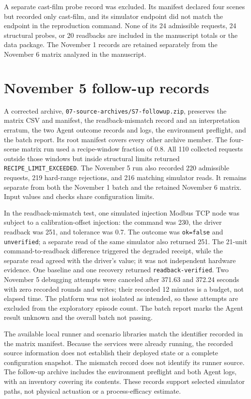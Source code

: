 \documentclass[10pt]{article}
\begin{document}
A separate cast-film probe record was excluded. Its manifest declared four scenes but recorded only cast-film, and its simulator endpoint did not match the endpoint in the reproduction command. None of its 24 admissible requests, 24 structural probes, or 20 readbacks are included in the manuscript totals or the data package. The November 1 records are retained separately from the November 6 matrix analyzed in the manuscript.

\section*{November 5 follow-up records}
A corrected archive, \texttt{07-source-archives/S7-followup.zip}, preserves the matrix CSV and manifest, the readback-mismatch record and an interpretation erratum, the two Agent outcome records and logs, the environment preflight, and the batch report. Its root manifest covers every other archive member. The four-scene matrix run used a recipe-window fraction of 0.8. All 110 collected requests outside those windows but inside structural limits returned \texttt{RECIPE\_LIMIT\_EXCEEDED}. The November 5 run also recorded 220 admissible requests, 219 hard-range rejections, and 216 matching simulator reads. It remains separate from both the November 1 batch and the retained November 6 matrix. Input values and checks share configuration limits.

In the readback-mismatch test, one simulated injection Modbus TCP node was subject to a calibration-offset injection: the command was 230, the driver readback was 251, and tolerance was 0.7. The outcome was \texttt{ok=false} and \texttt{unverified}; a separate read of the same simulator also returned 251. The 21-unit command-to-readback difference triggered the degraded receipt, while the separate read agreed with the driver's value; it was not independent hardware evidence. One baseline and one recovery returned \texttt{readback-verified}. Two November 5 debugging attempts were canceled after 371.63 and 372.24 seconds with zero recorded rounds and writes; their recorded 12 minutes is a budget, not elapsed time. The platform was not isolated as intended, so these attempts are excluded from the exploratory episode count. The batch report marks the Agent result unknown and the overall batch not passing.

The available local runner and scenario libraries match the identifier recorded in the matrix manifest. Because the services were already running, the recorded source information does not establish their deployed state or a complete configuration snapshot. The mismatch record does not identify its runner source. The follow-up archive includes the environment preflight and both Agent logs, with an inventory covering its contents. These records support selected simulator paths, not physical actuation or a process-efficacy estimate.
\end{document}
